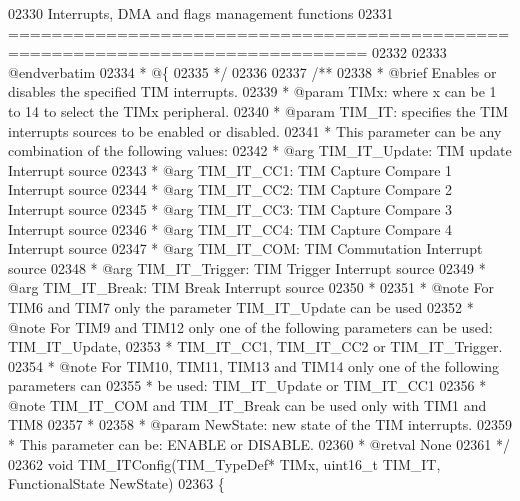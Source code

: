\begin{DoxyCode}
02330 \textcolor{comment}{                 Interrupts, DMA and flags management functions}
02331 \textcolor{comment}{ ===============================================================================  }
02332 \textcolor{comment}{}
02333 \textcolor{comment}{@endverbatim}
02334 \textcolor{comment}{  * @\{}
02335 \textcolor{comment}{  */}
02336 
02337 \textcolor{comment}{/**}
02338 \textcolor{comment}{  * @brief  Enables or disables the specified TIM interrupts.}
02339 \textcolor{comment}{  * @param  TIMx: where x can be 1 to 14 to select the TIMx peripheral.}
02340 \textcolor{comment}{  * @param  TIM\_IT: specifies the TIM interrupts sources to be enabled or disabled.}
02341 \textcolor{comment}{  *          This parameter can be any combination of the following values:}
02342 \textcolor{comment}{  *            @arg TIM\_IT\_Update: TIM update Interrupt source}
02343 \textcolor{comment}{  *            @arg TIM\_IT\_CC1: TIM Capture Compare 1 Interrupt source}
02344 \textcolor{comment}{  *            @arg TIM\_IT\_CC2: TIM Capture Compare 2 Interrupt source}
02345 \textcolor{comment}{  *            @arg TIM\_IT\_CC3: TIM Capture Compare 3 Interrupt source}
02346 \textcolor{comment}{  *            @arg TIM\_IT\_CC4: TIM Capture Compare 4 Interrupt source}
02347 \textcolor{comment}{  *            @arg TIM\_IT\_COM: TIM Commutation Interrupt source}
02348 \textcolor{comment}{  *            @arg TIM\_IT\_Trigger: TIM Trigger Interrupt source}
02349 \textcolor{comment}{  *            @arg TIM\_IT\_Break: TIM Break Interrupt source}
02350 \textcolor{comment}{  *  }
02351 \textcolor{comment}{  * @note   For TIM6 and TIM7 only the parameter TIM\_IT\_Update can be used}
02352 \textcolor{comment}{  * @note   For TIM9 and TIM12 only one of the following parameters can be used: TIM\_IT\_Update,}
02353 \textcolor{comment}{  *          TIM\_IT\_CC1, TIM\_IT\_CC2 or TIM\_IT\_Trigger. }
02354 \textcolor{comment}{  * @note   For TIM10, TIM11, TIM13 and TIM14 only one of the following parameters can}
02355 \textcolor{comment}{  *          be used: TIM\_IT\_Update or TIM\_IT\_CC1   }
02356 \textcolor{comment}{  * @note   TIM\_IT\_COM and TIM\_IT\_Break can be used only with TIM1 and TIM8 }
02357 \textcolor{comment}{  *        }
02358 \textcolor{comment}{  * @param  NewState: new state of the TIM interrupts.}
02359 \textcolor{comment}{  *          This parameter can be: ENABLE or DISABLE.}
02360 \textcolor{comment}{  * @retval None}
02361 \textcolor{comment}{  */}
02362 \textcolor{keywordtype}{void} TIM_ITConfig(TIM\_TypeDef* TIMx, uint16\_t TIM\_IT, FunctionalState NewState)
02363 \{

\end{DoxyCode}
